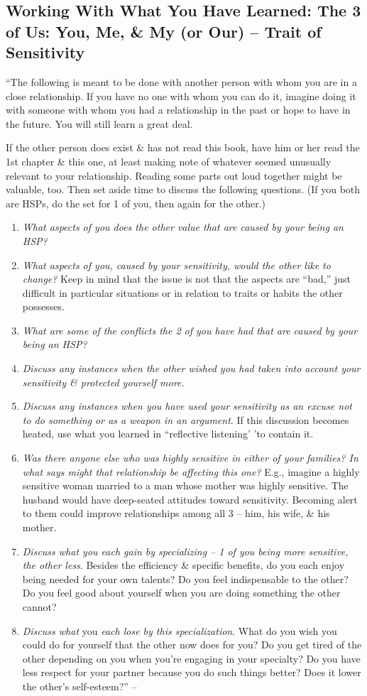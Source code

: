 \documentclass{article}
\numberwithin{equation}{section}
\begin{document}
\subsection{Working With What You Have Learned: The 3 of Us: You, Me, \& My (or Our) -- Trait of Sensitivity}
``The following is meant to be done with another person with whom you are in a close relationship. If you have no one with whom you can do it, imagine doing it with someone with whom you had a relationship in the past or hope to have in the future. You will still learn a great deal.

If the other person does exist \& has not read this book, have him or her read the 1st chapter \& this one, at least making note of whatever seemed unusually relevant to your relationship. Reading some parts out loud together might be valuable, too. Then set aside time to discuss the following questions. (If you both are HSPs, do the set for 1 of you, then again for the other.)
\begin{enumerate}
	\item \textit{What aspects of you does the other value that are caused by your being an HSP?}
	\item \textit{What aspects of you, caused by your sensitivity, would the other like to change?} Keep in mind that the issue is not that the aspects are ``bad,'' just difficult in particular situations or in relation to traits or habits the other possesses.
	\item \textit{What are some of the conflicts the 2 of you have had that are caused by your being an HSP?}
	\item \textit{Discuss any instances when the other wished you had taken into account your sensitivity \& protected yourself more.}
	\item \textit{Discuss any instances when you have used your sensitivity as an excuse not to do something or as a weapon in an argument}. If this discussion becomes heated, use what you learned in ``reflective listening' 'to contain it.
	\item \textit{Was there anyone else who was highly sensitive in either of your families? In what says might that relationship be affecting this one?} E.g., imagine a highly sensitive woman married to a man whose mother was highly sensitive. The husband would have deep-seated attitudes toward sensitivity. Becoming alert to them could improve relationships among all 3 -- him, his wife, \& his mother.
	\item \textit{Discuss what you each gain by specializing -- 1 of you being more sensitive, the other less}. Besides the efficiency \& specific benefits, do you each enjoy being needed for your own talents? Do you feel indispensable to the other? Do you feel good about yourself when you are doing something the other cannot?
	\item \textit{Discuss what} you \textit{each lose by this specialization}. What do you wish you could do for yourself that the other now does for you? Do you get tired of the other depending on you when you're engaging in your specialty? Do you have less respect for your partner because you do such things better? Does it lower the other's self-esteem?'' -- \cite[pp. 196--197]{Aron2013}
\end{enumerate}
\end{document}
